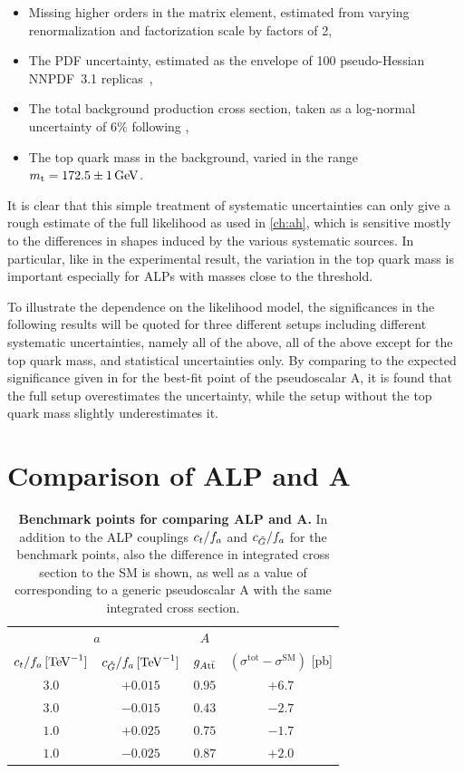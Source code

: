 \begin{itemize}
    \item Missing higher orders in the matrix element, estimated from varying renormalization and factorization scale by factors of 2,
    \item The PDF uncertainty, estimated as the envelope of 100 pseudo-Hessian NNPDF~3.1 replicas~\cite{NNPDF:2017mvq},
    \item The total \ttbar background production cross section, taken as a log-normal uncertainty of $6\%$ following ,
    \item The top quark mass in the \ttbar background, varied in the range $\mt = 172.5 \pm 1 \, \si{\GeV}$.
\end{itemize}

It is clear that this simple treatment of systematic uncertainties can only give a rough estimate of the full likelihood as used in \cref{ch:ah}, which is sensitive mostly to the differences in shapes induced by the various systematic sources.
In particular, like in the experimental result, the variation in the top quark mass is important especially for ALPs with masses close to the \ttbar threshold.

To illustrate the dependence on the likelihood model, the significances in the following results will be quoted for three different setups including different systematic uncertainties, namely all of the above, all of the above except for the top quark mass, and statistical uncertainties only. By comparing to the expected significance given in  for the best-fit point of the pseudoscalar A, it is found that the full setup overestimates the uncertainty, while the setup without the top quark mass slightly underestimates it. 

\section{Comparison of ALP and A}
\label{sec:alps:ALPvsA}

\begin{table}
\centering
\begin{tabular}{cc |c | c}
\multicolumn{2}{c}{$a$} & $A$ \\
$c_t/f_a \,  [\text{TeV}^{-1}]$ & $c_{\tilde{G}}/f_a \,  [\text{TeV}^{-1}]$ & $g_{A\mathrm{t \bar{t}}}$ & $(\sigma^\text{tot}-\sigma^\text{SM})$ [pb] \\
\hline
\hline
$3.0$ & $+0.015$ & $0.95$ & $+6.7$ \\
$3.0$ & $-0.015$ & $0.43$ & $-2.7$ \\
$1.0$ & $+0.025$ & $0.75$ & $-1.7$ \\
$1.0$ & $-0.025$ & $0.87$ & $+2.0$ \\
\end{tabular}
\caption{\textbf{Benchmark points for comparing ALP and A.} In addition to the ALP couplings $c_t/f_a$ and $c_{\tilde{G}}/f_a$ for the benchmark points, also the difference in integrated cross section to the SM is shown, as well as a value of \gAtt corresponding to a generic pseudoscalar A with the same integrated cross section.}
\label{tab:alps:benchmarks}
\end{table}

